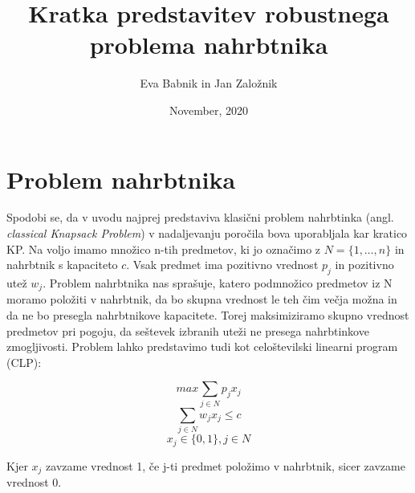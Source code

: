 \documentclass[a4paper,12pt]{article}
\begin{document}
\title{Kratka predstavitev robustnega problema nahrbtnika}
\author{Eva Babnik in Jan Založnik}
\date{November, 2020}
\maketitle


\newpage
\section{Problem nahrbtnika}


Spodobi se, da v uvodu najprej predstaviva klasični problem nahrbtinka (angl. \textit{classical Knapsack Problem})
 v nadaljevanju poročila bova uporabljala kar kratico KP. Na voljo imamo množico n-tih predmetov, ki jo 
označimo z $N = \{1, \dots, n\}$ in nahrbtnik s kapaciteto $c$. Vsak predmet ima pozitivno vrednost 
$p_{j}$ in pozitivno utež $w_{j}$. Problem nahrbtnika nas sprašuje, katero podmnožico predmetov iz N moramo 
položiti v nahrbtnik, da bo skupna vrednost le teh čim večja možna in da ne bo presegla nahrbtnikove kapacitete. 
Torej maksimiziramo skupno vrednost predmetov pri pogoju, da seštevek izbranih uteži ne presega nahrbtinkove zmogljivosti.
Problem lahko predstavimo tudi kot celoštevilski linearni program (CLP):


\begin{equation}
    \tag*{}
     max \sum_{j \in N} p_{j}x_{j}
\end{equation}
\begin{equation}
    \tag*{}
    \sum_{j \in N} w_{j}x_{j} \leq c
\end{equation}
\begin{equation}
    \tag*{}
    x_{j} \in \{0,1\}, j \in N
\end{equation}

\medskip
\noindent Kjer $x_{j}$ zavzame vrednost 1, če j-ti predmet položimo v nahrbtnik,
 sicer zavzame vrednost 0. 
\end{document}
